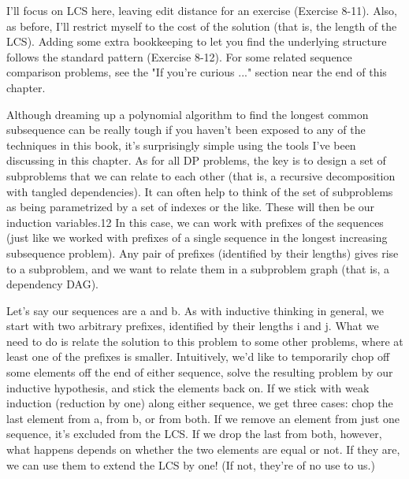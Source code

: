 I'll focus on LCS here, leaving edit distance for an exercise (Exercise 8-11). Also, as before, I'll restrict myself to the cost of the solution (that is, the length of the LCS). Adding some extra bookkeeping to let you find the underlying structure follows the standard pattern (Exercise 8-12). For some related sequence comparison problems, see the "If you're curious ..." section near the end of this chapter.

Although dreaming up a polynomial algorithm to find the longest common subsequence can be
really tough if you haven't been exposed to any of the techniques in this book, it's surprisingly simple using the tools I've been discussing in this chapter. As for all DP problems, the key is to design a set of subproblems that we can relate to each other (that is, a recursive decomposition with tangled dependencies). It can often help to think of the set of subproblems as being parametrized by a set of indexes or the like. These will then be our induction variables.12 In this case, we can work with prefixes of the sequences (just like we worked with prefixes of a single sequence in the longest increasing subsequence problem). Any pair of prefixes (identified by their lengths) gives rise to a subproblem, and we want to relate them in a subproblem graph (that is, a dependency DAG).

Let's say our sequences are a and b. As with inductive thinking in general, we start with two arbitrary prefixes, identified by their lengths i and j. What we need to do is relate the solution to this problem to some other problems, where at least one of the prefixes is smaller. Intuitively, we'd like to temporarily chop off some elements off the end of either sequence, solve the resulting problem by our inductive hypothesis, and stick the elements back on. If we stick with weak induction (reduction by one) along either sequence, we get three cases: chop the last element from a, from b, or from both. If we remove an element from just one sequence, it's excluded from the LCS. If we drop the last from both, however, what happens depends on whether the two elements are equal or not. If they are, we can use them to extend the LCS by one! (If not, they're of no use to us.)

